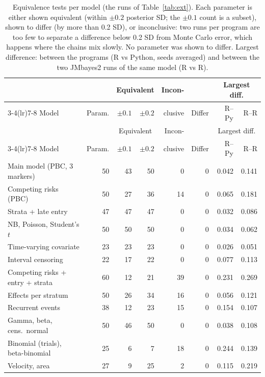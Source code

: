 \begingroup\small\setlength{\tabcolsep}{4pt}
\begin{longtable}{lrrrrrrr}
\caption{Equivalence tests per model (the runs of Table~\ref{tab:ext}). Each parameter is either shown equivalent (within $\pm 0.2$ posterior SD; the $\pm 0.1$ count is a subset), shown to differ (by more than 0.2 SD), or inconclusive: two runs per program are too few to separate a difference below 0.2 SD from Monte Carlo error, which happens where the chains mix slowly. No parameter was shown to differ. Largest difference: between the programs (R vs Python, seeds averaged) and between the two JMbayes2 runs of the same model (R vs R).}\label{tab:extdetail}\\
\toprule & & \multicolumn{2}{c}{Equivalent} & Incon- & & \multicolumn{2}{c}{Largest diff.} \\
\cmidrule(lr){3-4}\cmidrule(lr){7-8}
Model & Param. & $\pm 0.1$ & $\pm 0.2$ & clusive & Differ & R--Py & R--R \\ \midrule \endfirsthead
\toprule & & \multicolumn{2}{c}{Equivalent} & Incon- & & \multicolumn{2}{c}{Largest diff.} \\
\cmidrule(lr){3-4}\cmidrule(lr){7-8}
Model & Param. & $\pm 0.1$ & $\pm 0.2$ & clusive & Differ & R--Py & R--R \\ \midrule \endhead
\bottomrule \endlastfoot
Main model (PBC, 3 markers) & 50 & 43 & 50 & 0 & 0 & 0.042 & 0.141 \\
Competing risks (PBC) & 50 & 27 & 36 & 14 & 0 & 0.065 & 0.181 \\
Strata + late entry & 47 & 47 & 47 & 0 & 0 & 0.032 & 0.086 \\
NB, Poisson, Student's $t$ & 50 & 50 & 50 & 0 & 0 & 0.034 & 0.062 \\
Time-varying covariate & 23 & 23 & 23 & 0 & 0 & 0.026 & 0.051 \\
Interval censoring & 22 & 17 & 22 & 0 & 0 & 0.077 & 0.113 \\
Competing risks + entry + strata & 60 & 12 & 21 & 39 & 0 & 0.231 & 0.269 \\
Effects per stratum & 50 & 26 & 34 & 16 & 0 & 0.056 & 0.121 \\
Recurrent events & 38 & 12 & 23 & 15 & 0 & 0.154 & 0.107 \\
Gamma, beta, cens.\ normal & 50 & 46 & 50 & 0 & 0 & 0.038 & 0.108 \\
Binomial (trials), beta-binomial & 25 & 6 & 7 & 18 & 0 & 0.244 & 0.139 \\
Velocity, area & 27 & 9 & 25 & 2 & 0 & 0.115 & 0.219 \\

\end{longtable}
